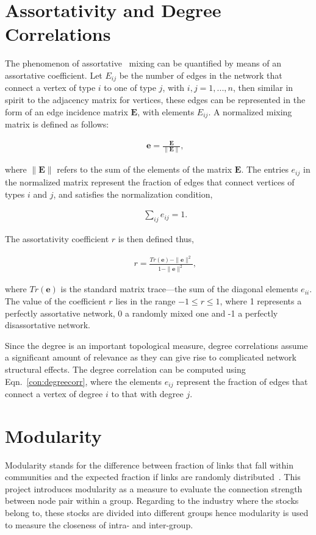 \section{Assortativity and Degree Correlations}

The phenomenon of assortative~\cite{newman2002assortative} mixing can be quantified by means of an assortative
coefficient. Let $E_{ij}$ be the number of edges in the network that connect
a vertex of type $i$ to one of type $j$, with $i, j=1, . . . , n$, then similar in spirit to the
adjacency matrix for vertices, these edges can be represented in the form of an edge
incidence matrix $\mathbf{E}$, with elements $E_{ij}$. A normalized mixing matrix is defined as follows:

\begin{eqnarray}
&&\mathbf{e}=\frac{\mathbf{E}}{\|\mathbf{E}\|},
\end{eqnarray}

where $\|\mathbf{E}\|$ refers to the sum of the elements of the matrix $\mathbf{E}$. The entries $e_{ij}$ in the normalized matrix represent the fraction of edges that connect vertices of types $i$ and $j$, and satisfies the normalization condition,

\begin{eqnarray}
&&\sum_{ij}e_{ij}=1.
\end{eqnarray}

The assortativity coefficient $r$ is then defined thus,

\begin{eqnarray}
&&r=\frac{Tr(\mathbf{e})-\|\mathbf{e}\|^2}{1-\|\mathbf{e}\|^2},\label{con:degreecorr}
\end{eqnarray}

where $Tr(\mathbf{e})$ is the standard matrix trace—the sum of the diagonal elements $e_{ii}$. The value of the coefficient $r$ lies in the range $-1\leq{r}\leq{1}$, where 1 represents a perfectly assortative network, 0 a randomly mixed one and -1 a perfectly disassortative network.

Since the degree is an important topological measure, degree correlations assume a significant amount of relevance as they can give rise to complicated network structural effects. The degree correlation can be computed using Eqn.~\ref{con:degreecorr}, where the elements $e_{ij}$ represent the fraction of edges that connect a vertex of degree $i$ to that with degree $j$.

\section{Modularity}
Modularity stands for the difference between fraction of links that fall within communities and the expected fraction if links are randomly distributed~\cite{newman2004finding}. This project introduces modularity as a measure to evaluate the connection strength between node pair within a group. Regarding to the industry where the stocks belong to, these stocks are divided into different groups hence modularity is used to measure the closeness of intra- and inter-group.

